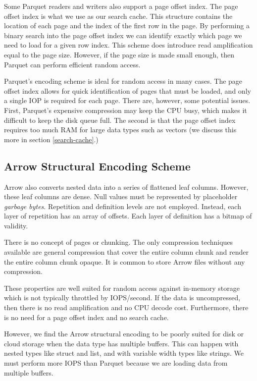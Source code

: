 \documentclass[sigconf, nonacm]{acmart}
\begin{document}
Some Parquet readers and writers also support a page offset index.  The page offset index is what we use as our search cache.  This structure contains the location of each page and the index of the first row in the page.  By performing a binary search into the page offset index we can identify exactly which page we need to load for a given row index.  This scheme does introduce read amplification equal to the page size.  However, if the page size is made small enough, then Parquet can perform efficient random access.

Parquet's encoding scheme is ideal for random access in many cases.  The page offset index allows for quick identification of pages that must be loaded, and only a single IOP is required for each page.  There are, however, some potential issues.  First, Parquet's expensive compression may keep the CPU busy, which makes it difficult to keep the disk queue full.  The second is that the page offset index requires too much RAM for large data types such as vectors (we discuss this more in section \ref{search-cache}.)

\subsection{Arrow Structural Encoding Scheme} \label{arrow-structural}

Arrow also converts nested data into a series of flattened leaf columns.  However, these leaf columns are dense.  Null values must be represented by placeholder \textit{garbage bytes}.  Repetition and definition levels are not employed.  Instead, each layer of repetition has an array of offsets.  Each layer of definition has a bitmap of validity.

There is no concept of pages or chunking.  The only compression techniques available are general compression that cover the entire column chunk and render the entire column chunk opaque.  It is common to store Arrow files without any compression.

These properties are well suited for random access against in-memory storage which is not typically throttled by IOPS/second.  If the data is uncompressed, then there is no read amplification and no CPU decode cost.  Furthermore, there is no need for a page offset index and no search cache.

However, we find the Arrow structural encoding to be poorly suited for disk or cloud storage when the data type has multiple buffers.  This can happen with nested types like struct and list, and with variable width types like strings.  We must perform more IOPS than Parquet because we are loading data from multiple buffers.
\end{document}

